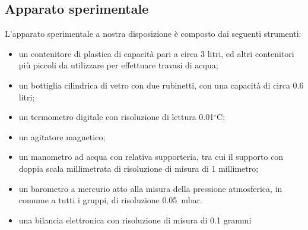 \subsection{Apparato sperimentale}

L'apparato sperimentale a nostra disposizione è composto dai seguenti strumenti:

\begin{itemize}
	\item{un contenitore di plastica di capacità pari a circa 3 litri, ed altri contenitori più piccoli da utilizzare per effettuare travasi di acqua;}
	\item{un bottiglia cilindrica di vetro con due rubinetti, con una capacità di circa 0.6 litri;}
	\item{un termometro digitale con risoluzione di lettura 0.01$^\circ$C;}
	\item{un agitatore magnetico;}
	\item{un manometro ad acqua con relativa supporteria, tra cui il supporto con doppia scala millimetrata di risoluzione di misura di 1 millimetro;}
	\item{un barometro a mercurio atto alla misura della pressione atmosferica, in comume a tutti i gruppi,
    di risoluzione \SI{0.05}{\milli\bar}.}
	\item{una bilancia elettronica con risoluzione di misura di 0.1 grammi}
\end{itemize}
